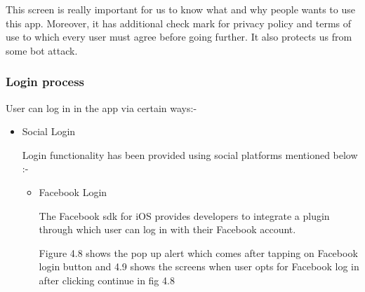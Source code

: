 \begin{itemize}
    This screen is really important for us to know what and why people wants to use this app. Moreover, it has additional check mark for privacy policy and terms of use to which every user must agree before going further. It also protects us from some bot attack.
    
    \newpage
 
\end{itemize}


\subsubsection{Login process}

User can log in in the app via certain ways:-

\begin{itemize}
    \item Social Login
    
    Login functionality has been provided using social platforms mentioned below :-
    
    \begin{itemize}
        \item Facebook Login
        
       The Facebook \gls{sdk} for \gls{iOS} provides developers to integrate a plugin through which user can log in with their Facebook account.
       
       Figure 4.8 shows the pop up alert which comes after tapping on Facebook login button and 4.9 shows the screens when user opts for Facebook log in after clicking continue in fig 4.8
       

\end{itemize}
\end{itemize}
